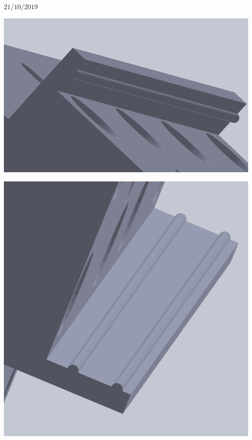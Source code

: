 \documentclass[12pt,dvipsnames]{exam}
\begin{document}
\hrulefill

$21/10/2019$


\begin{center}
	\includegraphics[scale=1.0]{imgs/3d_xy/enganche.png}
\end{center}


\begin{center}
	\includegraphics[scale=1.0]{imgs/3d_xy/enganche2.png}
\end{center}


\hrulefill
\end{document}
